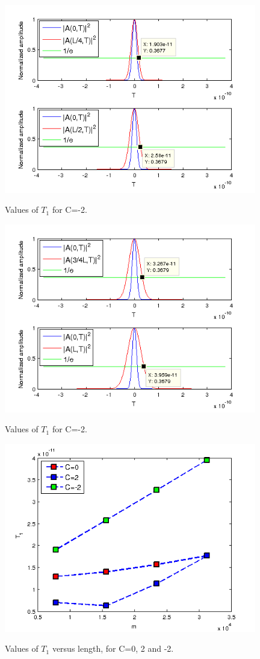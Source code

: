 \documentclass[a4paper,10pt]{report}
\begin{document}
\begin{figure}[!ht]
  \centering
  \includegraphics[width=11cm]{es2_cm21.png}\\
  \caption{Values of $T_1$ for C=-2.}
  \label{es2_Cm21}
\end{figure}

\begin{figure}[!ht]
  \centering
  \includegraphics[width=11cm]{es2_cm22.png}\\
  \caption{Values of $T_1$ for C=-2.}
  \label{es2_Cm22}
\end{figure}

\begin{figure}[!ht]
  \centering
  \includegraphics[width=11cm]{es2_plot.png}\\
  \caption{Values of $T_1$ versus length, for C=0, 2 and -2.}
  \label{es2_plot}
\end{figure}
\end{document}
